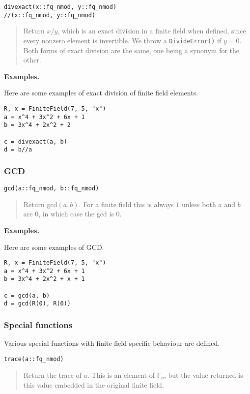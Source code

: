 \documentclass[a4paper,10pt]{article}
\newcommand{\F}{\mathbb{F}}
\newcommand{\code}{\lstinline}
\newcommand{\desc}[1]{\vspace{-3mm}\begin{quote}#1\end{quote}}
\begin{document}
{{\begin{lstlisting}
divexact(x::fq_nmod, y::fq_nmod)
//(x::fq_nmod, y::fq_nmod)
\end{lstlisting}

\desc{Return $x/y$, which is an exact division in a finite field when defined,
since every nonzero element is invertible. We throw a \code{DivideError()} if
$y = 0$. Both forms of exact division are the same, one being a synonym for 
the other.}

\textbf{Examples.}

Here are some examples of exact division of finite field elements.

\begin{lstlisting}
R, x = FiniteField(7, 5, "x")
a = x^4 + 3x^2 + 6x + 1
b = 3x^4 + 2x^2 + 2

c = divexact(a, b)
d = b//a
\end{lstlisting}

\subsubsection{GCD}

\begin{lstlisting}
gcd(a::fq_nmod, b::fq_nmod)
\end{lstlisting}

\desc{Return gcd$(a, b)$. For a finite field this is always $1$ unless both
$a$ and $b$ are $0$, in which case the gcd is $0$.}

\textbf{Examples.}

Here are some examples of GCD.

\begin{lstlisting}
R, x = FiniteField(7, 5, "x")
a = x^4 + 3x^2 + 6x + 1
b = 3x^4 + 2x^2 + x + 1

c = gcd(a, b)
d = gcd(R(0), R(0))
\end{lstlisting}

\subsubsection{Special functions}

Various special functions with finite field specific behaviour are
defined.

\begin{lstlisting}
trace(a::fq_nmod)
\end{lstlisting}

\desc{Return the trace of $a$. This is an element of $\F_p$, but the value
returned is this value embedded in the original finite field.}

}}
\end{document}
